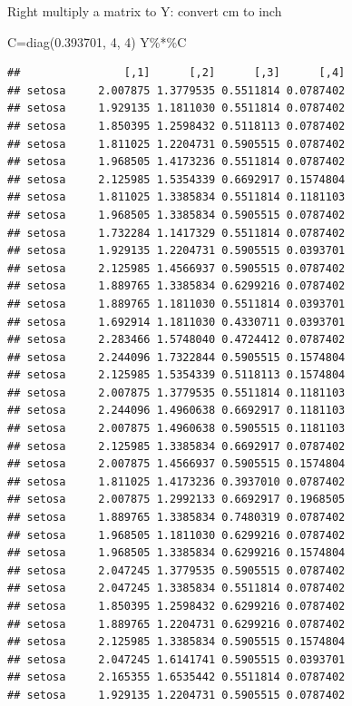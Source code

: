 \documentclass[
  ignorenonframetext,
]{beamer}
\newenvironment{Shaded}{\begin{snugshade}}{\end{snugshade}}
\newcommand{\DecValTok}[1]{\textcolor[rgb]{0.00,0.00,0.81}{#1}}
\newcommand{\FloatTok}[1]{\textcolor[rgb]{0.00,0.00,0.81}{#1}}
\newcommand{\FunctionTok}[1]{\textcolor[rgb]{0.00,0.00,0.00}{#1}}
\newcommand{\NormalTok}[1]{#1}
\newcommand{\OtherTok}[1]{\textcolor[rgb]{0.56,0.35,0.01}{#1}}
\newcommand{\SpecialCharTok}[1]{\textcolor[rgb]{0.00,0.00,0.00}{#1}}
\begin{document}
\begin{frame}[fragile]{Right multiply a matrix to Y: convert cm to inch}
\protect\hypertarget{right-multiply-a-matrix-to-y-convert-cm-to-inch-1}{}
\begin{Shaded}
\begin{Highlighting}[]
\NormalTok{C}\OtherTok{=}\FunctionTok{diag}\NormalTok{(}\FloatTok{0.393701}\NormalTok{, }\DecValTok{4}\NormalTok{, }\DecValTok{4}\NormalTok{)}
\NormalTok{Y}\SpecialCharTok{\%*\%}\NormalTok{C}
\end{Highlighting}
\end{Shaded}

\begin{verbatim}
##                [,1]      [,2]      [,3]      [,4]
## setosa     2.007875 1.3779535 0.5511814 0.0787402
## setosa     1.929135 1.1811030 0.5511814 0.0787402
## setosa     1.850395 1.2598432 0.5118113 0.0787402
## setosa     1.811025 1.2204731 0.5905515 0.0787402
## setosa     1.968505 1.4173236 0.5511814 0.0787402
## setosa     2.125985 1.5354339 0.6692917 0.1574804
## setosa     1.811025 1.3385834 0.5511814 0.1181103
## setosa     1.968505 1.3385834 0.5905515 0.0787402
## setosa     1.732284 1.1417329 0.5511814 0.0787402
## setosa     1.929135 1.2204731 0.5905515 0.0393701
## setosa     2.125985 1.4566937 0.5905515 0.0787402
## setosa     1.889765 1.3385834 0.6299216 0.0787402
## setosa     1.889765 1.1811030 0.5511814 0.0393701
## setosa     1.692914 1.1811030 0.4330711 0.0393701
## setosa     2.283466 1.5748040 0.4724412 0.0787402
## setosa     2.244096 1.7322844 0.5905515 0.1574804
## setosa     2.125985 1.5354339 0.5118113 0.1574804
## setosa     2.007875 1.3779535 0.5511814 0.1181103
## setosa     2.244096 1.4960638 0.6692917 0.1181103
## setosa     2.007875 1.4960638 0.5905515 0.1181103
## setosa     2.125985 1.3385834 0.6692917 0.0787402
## setosa     2.007875 1.4566937 0.5905515 0.1574804
## setosa     1.811025 1.4173236 0.3937010 0.0787402
## setosa     2.007875 1.2992133 0.6692917 0.1968505
## setosa     1.889765 1.3385834 0.7480319 0.0787402
## setosa     1.968505 1.1811030 0.6299216 0.0787402
## setosa     1.968505 1.3385834 0.6299216 0.1574804
## setosa     2.047245 1.3779535 0.5905515 0.0787402
## setosa     2.047245 1.3385834 0.5511814 0.0787402
## setosa     1.850395 1.2598432 0.6299216 0.0787402
## setosa     1.889765 1.2204731 0.6299216 0.0787402
## setosa     2.125985 1.3385834 0.5905515 0.1574804
## setosa     2.047245 1.6141741 0.5905515 0.0393701
## setosa     2.165355 1.6535442 0.5511814 0.0787402
## setosa     1.929135 1.2204731 0.5905515 0.0787402

\end{verbatim}
\end{frame}
\end{document}

